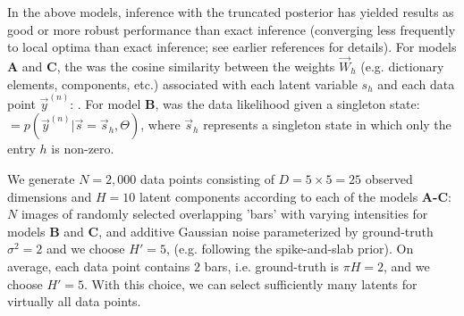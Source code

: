 In the above models, inference with the truncated posterior    \rev{$\Kn$} \rev{[of selected relevant variables} \rev{], shown in Equation~\eqref{eq:sel-func},} has yielded results as good or more robust performance than exact inference (converging less frequently to local optima than exact inference; see earlier references for details).
For models \textbf{A} and \textbf{C}, the   was the cosine similarity between the weights $\vec{W}_h$ (e.g. dictionary elements, components, etc.) associated with each latent variable $s_h$ and each data point $\vec{y}^{(n)}$: 
%
 .
For model \textbf{B},  was the data likelihood given a singleton state:
%
 $= p(\vec{y}^{(n)} | \vec{s}=\vec{s}_h, \Theta)$, 
%
where $\vec{s}_h$ represents a singleton state in which only the entry $h$ is non-zero.

We generate $N=2,000$ data points consisting of $D=5\times5=25$ observed dimensions and $H=10$ latent components according to each of the models \textbf{A-C}:
$N$ images of randomly selected overlapping 'bars' with varying intensities for models \textbf{B} and \textbf{C}, and additive Gaussian noise parameterized by ground-truth $\sigma^2 = 2$ and we choose $H' = 5$, (e.g. following the spike-and-slab prior). 
On average, each data point contains $2$ bars, i.e. ground-truth is $\pi H = 2$, and we choose $H'=5$. With this choice,
we can select sufficiently many latents for virtually all data points.

